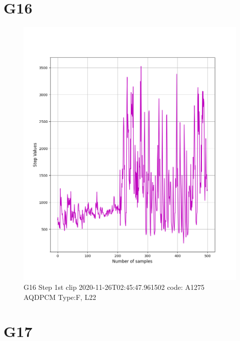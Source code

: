 \documentclass[hidelinks, 12pt, a4paper]{article}
\begin{document}
\section{G16}

\begin{figure}[h!]
\centering
	\includegraphics[height=.38\textheight, width=\textwidth]{assets/session1/g16.png}
    \caption{G16 Step 1st clip  2020-11-26T02:45:47.961502 code: A1275 AQDPCM Type:F, L22}
\end{figure}

\section{G17}
\end{document}
